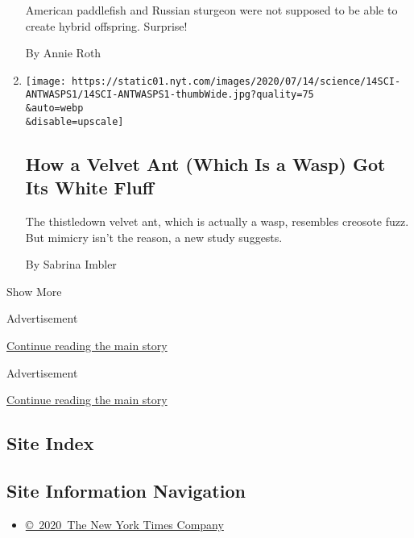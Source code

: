 \begin{enumerate}
  American paddlefish and Russian sturgeon were not supposed to be able
  to create hybrid offspring. Surprise!

  By Annie Roth
\item
  \href{/2020/07/14/science/white-fluffy-ant-wasp.html}{}

  \texttt{[image: https://static01.nyt.com/images/2020/07/14/science/14SCI-ANTWASPS1/14SCI-ANTWASPS1-thumbWide.jpg?quality=75\\\&auto=webp\\\&disable=upscale]}

  \hypertarget{how-a-velvet-ant-which-is-a-wasp-got-its-white-fluff}{%
  \subsection{How a Velvet Ant (Which Is a Wasp) Got Its White
  Fluff}\label{how-a-velvet-ant-which-is-a-wasp-got-its-white-fluff}}

  The thistledown velvet ant, which is actually a wasp, resembles
  creosote fuzz. But mimicry isn't the reason, a new study suggests.

  By Sabrina Imbler
\end{enumerate}

Show More

Advertisement

\protect\hyperlink{after-mid1}{Continue reading the main story}

Advertisement

\protect\hyperlink{after-mktg}{Continue reading the main story}

\hypertarget{site-index}{%
\subsection{Site Index}\label{site-index}}

\hypertarget{site-information-navigation}{%
\subsection{Site Information
Navigation}\label{site-information-navigation}}

\begin{itemize}
\tightlist
\item
  \href{https://help.nytimes.com/hc/en-us/articles/115014792127-Copyright-notice}{©~2020~The
  New York Times Company}
\end{itemize}

